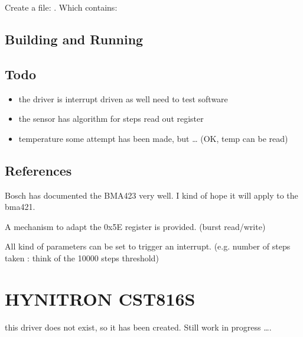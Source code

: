 \documentclass[letterpaper,10pt,english]{sphinxmanual}
\begin{document}
Create a file: .
Which contains:

\begin{sphinxVerbatim}[commandchars=\\\{\}]
 
 
        
        
\end{sphinxVerbatim}


\subsection{Building and Running}
\label{\detokenize{drivers/bma421:building-and-running}}

\subsection{Todo}
\label{\detokenize{drivers/bma421:todo}}\begin{itemize}
\item {} 
the driver is interrupt driven as well \textendash{} need to test software

\item {} 
the sensor has algorithm for steps \textendash{} read out register

\item {} 
temperature some attempt has been made, but … (OK, temp can be read)

\end{itemize}


\subsection{References}
\label{\detokenize{drivers/bma421:references}}
Bosch has documented the BMA423 very well.
I kind of hope it will apply to the bma421.

A mechanism to adapt the 0x5E register is provided.
(burst read/write)

All kind of parameters can be set to trigger an interrupt.
(e.g. number of steps taken : think of the 10000 steps threshold)


\section{HYNITRON CST816S}
\label{\detokenize{drivers/cst816s:hynitron-cst816s}}\label{\detokenize{drivers/cst816s::doc}}
this driver does not exist, so it has been created.
Still work in progress ….
\end{document}
